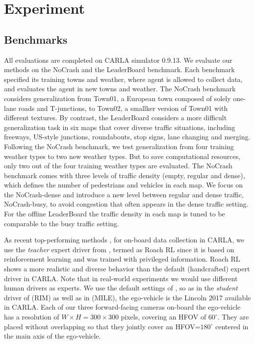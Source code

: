 \section{Experiment}
%	

\subsection{Benchmarks} \label{sec:Dataset}

\hspace{1pc}All evaluations are completed on CARLA simulator \cite{Dosovitskiy:2017} 0.9.13. 
We evaluate our methods on the NoCrash\cite{codevilla2019exploring} and the LeaderBoard benchmark.
Each benchmark specified its training towns and weather, where agent is allowed to collect data, and evaluates the agent in new towns and weather.
The NoCrash benchmark considers generalization from Town01, a European town composed of solely one-lane roads and T-junctions, to Town02, a smallker version of Town01 with different textures.
By contrast, the LeaderBoard considers a more difficult generalization task in six maps that cover diverse traffic situations, including freeways, US-style junctions, roundabouts, stop signs, lane changing and merging.
Following the NoCrash benchmark, we test generalization from four training weather types to two new weather types.
But to save computational resources, only two out of the four training weather types are evaluated.
The NoCrash benchmark comes with three levels of traffic density (empty, regular and dense), which defines the number of pedestrians and vehicles in each map.
We focus on the NoCrash-dense and introduce a new level between regular and dense traffic, NoCrash-busy, to avoid congestion that often appears in the dense traffic setting.
For the offline LeaderBoard the traffic density in each map is tuned to be comparable to the busy traffic setting. 


As recent top-performing methods \cite{Hu:2022}, for on-board data collection in CARLA, we use the \emph{teacher} expert driver from \cite{Zhang:2021}, termed as Roach RL since it is based on reinforcement learning and was trained with privileged information. 
Roach RL shows a more realistic and diverse behavior than the default (handcrafted) expert driver in CARLA. 
Note that in real-world experiments we would use different human drivers as experts. 
We use the default settings of \cite{Zhang:2021}, so as in the \emph{student} driver of \cite{Zhang:2021} (RIM) as well as in \cite{Hu:2022} (MILE), the ego-vehicle is the Lincoln 2017 available in CARLA. 
Each of our three forward-facing cameras on-board the ego-vehicle has a resolution of $W\times H=300\times300$ pixels, covering an HFOV of $60^{\circ}$. 
They are placed without overlapping so that they jointly cover an HFOV=$180^{\circ}$ centered in the main axis of the ego-vehicle. 


